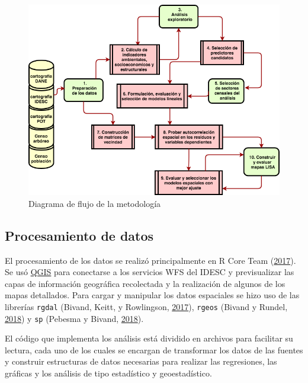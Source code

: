 \documentclass[12pt,a4paper,openany]{book}
\theoremstyle{definition}
\theoremstyle{definition}
\theoremstyle{definition}
\theoremstyle{remark}
\begin{document}
\begin{figure}

{\centering \includegraphics[width=1\linewidth]{images/flujograma} 

}

\caption{Diagrama de flujo de la metodología}\label{fig:flujograma}
\end{figure}

\subsection{Procesamiento de datos}\label{procesamiento-de-datos}

El procesamiento de los datos se realizó principalmente en R Core Team
(\protect\hyperlink{ref-R-base}{2017}). Se usó
\href{http://www.qgis.org/es/site/}{QGIS} para conectarse a los
servicios WFS del IDESC y previsualizar las capas de información
geográfica recolectada y la realización de algunos de los mapas
detallados. Para cargar y manipular los datos espaciales se hizo uso de
las librerías \texttt{rgdal} (Bivand, Keitt, y Rowlingson,
\protect\hyperlink{ref-R-rgdal}{2017}), \texttt{rgeos} (Bivand y Rundel,
\protect\hyperlink{ref-R-rgeos}{2018}) y \texttt{sp} (Pebesma y Bivand,
\protect\hyperlink{ref-R-sp}{2018}).

El código que implementa los análisis está dividido en archivos para
facilitar su lectura, cada uno de los cuales se encargan de transformar
los datos de las fuentes y construir estructuras de datos necesarias
para realizar las regresiones, las gráficas y los análisis de tipo
estadístico y geoestadístico.
\end{document}
